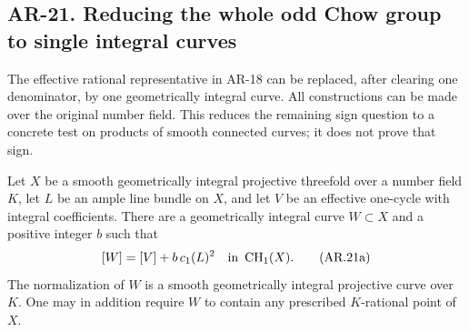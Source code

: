 \subsection*{AR-21. Reducing the whole odd Chow group to single integral curves}

The effective rational representative in AR-18 can be replaced, after
clearing one denominator, by one geometrically integral curve.  All
constructions can be made over the original number field.  This reduces
the remaining sign question to a concrete test on products of smooth
connected curves; it does not prove that sign.

\begin{lemma}[AR-21a]
Let $X$ be a smooth geometrically integral projective threefold over a
number field $K$, let $L$ be an ample line bundle on $X$, and let $V$ be an
effective one-cycle with integral coefficients.  There are a
geometrically integral curve $W\subset X$ and a positive integer $b$ such
that
\[
 [W]=[V]+b\,c_1(L)^2\quad\hbox{in }\operatorname{CH}_1(X).
 \tag{AR.21a}
\]
The normalization of $W$ is a smooth geometrically integral projective
curve over $K$.  One may in addition require $W$ to contain any
prescribed $K$-rational point of $X$.
\end{lemma}

